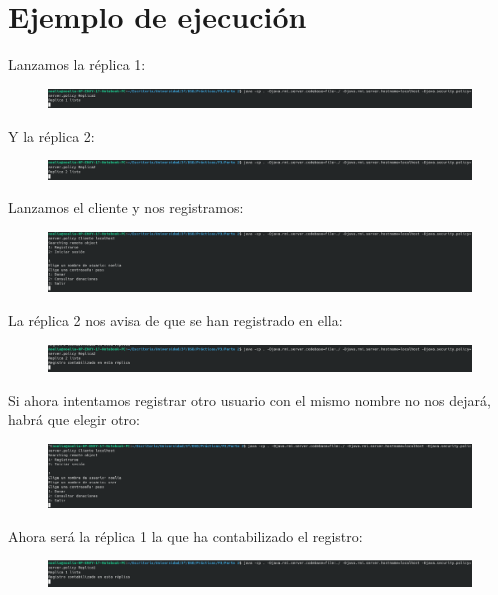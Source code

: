 \documentclass{article}
\begin{document}
	\section{Ejemplo de ejecución}
	Lanzamos la réplica 1:
	\begin{figure}[H]
		\centering
		\includegraphics[totalheight=0.58cm]{img/18.png}
	\end{figure}
	Y la réplica 2:
	\begin{figure}[H]
		\centering
		\includegraphics[totalheight=0.58cm]{img/19.png}
	\end{figure}
	Lanzamos el cliente y nos registramos:
	\begin{figure}[H]
		\centering
		\includegraphics[totalheight=1.8cm]{img/20.png}
	\end{figure}
	La réplica 2 nos avisa de que se han registrado en ella:
	\begin{figure}[H]
		\centering
		\includegraphics[totalheight=0.82cm]{img/21.png}
	\end{figure}
	Si ahora intentamos registrar otro usuario con el mismo nombre no nos dejará, habrá que elegir otro:
	\begin{figure}[H]
		\centering
		\includegraphics[totalheight=1.95cm]{img/22.png}
	\end{figure}
	Ahora será la réplica 1 la que ha contabilizado el registro:
	\begin{figure}[H]
		\centering
		\includegraphics[totalheight=0.81cm]{img/23.png}
	\end{figure}
\end{document}
